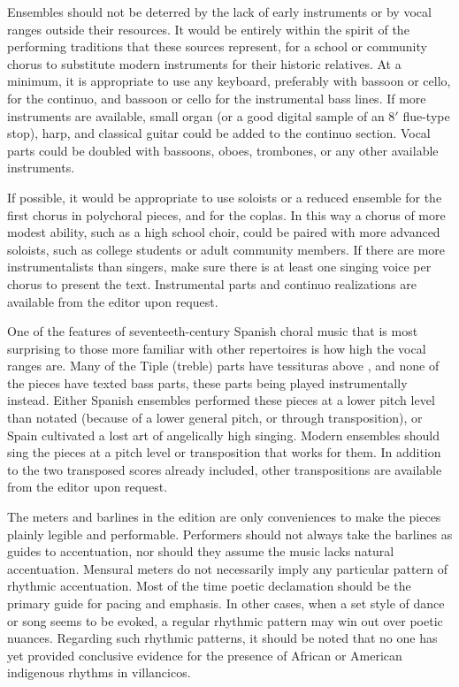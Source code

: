 Ensembles should not be deterred by the lack of early instruments or by vocal
ranges outside their resources.
It would be entirely within the spirit of the performing traditions that these
sources represent, for a school or community chorus to substitute modern
instruments for their historic relatives.
At a minimum, it is appropriate to use any keyboard, preferably with bassoon or
cello, for the continuo, and bassoon or cello for the instrumental bass lines.
If more instruments are available, small organ (or a good digital sample of an 
8$'$ flue-type stop), harp, and classical guitar could be added to the continuo
section.  
Vocal parts could be doubled with bassoons, oboes, trombones, or any other
available instruments.

If possible, it would be appropriate to use soloists or a reduced ensemble for
the first chorus in polychoral pieces, and for the coplas.
In this way a chorus of more modest ability, such as a high school choir, could
be paired with more advanced soloists, such as college students or adult
community members.
If there are more instrumentalists than singers, make sure there is at least one
singing voice per chorus to present the text.
Instrumental parts and continuo realizations are available from the editor upon
request.

One of the features of seventeeth-century Spanish choral music that is most
surprising to those more familiar with other repertoires is how high the vocal
ranges are.
Many of the Tiple (treble) parts have tessituras above , and none of
the pieces have texted bass parts, these parts being played instrumentally
instead.
Either Spanish ensembles performed these pieces at a lower pitch level than
notated (because of a lower general pitch, or through transposition), or Spain
cultivated a lost art of angelically high singing.
Modern ensembles should sing the pieces at a pitch level or transposition that
works for them.
In addition to the two transposed scores already included, other transpositions  
are available from the editor upon request.

The meters and barlines in the edition are only conveniences to make the pieces
plainly legible and performable.
Performers should not always take the barlines as guides to accentuation, nor
should they assume the music lacks natural accentuation.
Mensural meters do not necessarily imply any particular pattern of rhythmic 
accentuation.
Most of the time poetic declamation should be the primary guide for pacing
and emphasis.
In other cases, when a set style of dance or song seems to be evoked, a regular
rhythmic pattern may win out over poetic nuances.
Regarding such rhythmic patterns, it should be noted that no one has yet
provided conclusive evidence for the presence of African or American indigenous
rhythms in villancicos.

